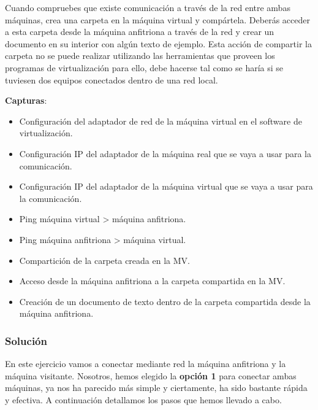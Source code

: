 Cuando compruebes que existe comunicación a través de la red entre ambas máquinas, crea una carpeta en la máquina virtual y compártela. Deberás acceder a esta carpeta desde la máquina anfitriona a través de la red y crear un documento en su interior con algún texto de ejemplo. Esta acción de compartir la carpeta no se puede realizar utilizando las herramientas que proveen los programas de virtualización para ello, debe hacerse tal como se haría si se tuviesen dos equipos conectados dentro de una red local.

\textbf{Capturas}:

\begin{itemize}
    \item Configuración del adaptador de red de la máquina virtual en el software de virtualización.
    \item Configuración IP del adaptador de la máquina real que se vaya a usar para la comunicación.
    \item Configuración IP del adaptador de la máquina virtual que se vaya a usar para la comunicación.
    \item Ping máquina virtual > máquina anfitriona.
    \item Ping máquina anfitriona > máquina virtual.
    \item Compartición de la carpeta creada en la MV.
    \item Acceso desde la máquina anfitriona a la carpeta compartida en la MV.
    \item Creación de un documento de texto dentro de la carpeta compartida desde la máquina anfitriona.
\end{itemize}

\subsubsection{Solución}
En este ejercicio vamos a conectar mediante red la máquina anfitriona y la máquina visitante. Nosotros, hemos elegido la \textbf{opción 1} para conectar ambas máquinas, ya nos ha parecido más simple y ciertamente, ha sido bastante rápida y efectiva. A continuación detallamos los pasos que hemos llevado a cabo.

